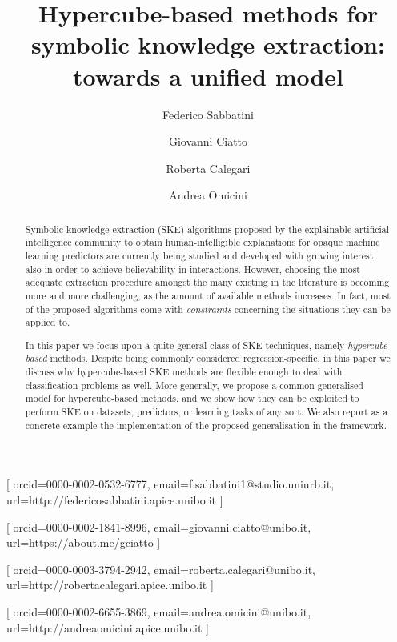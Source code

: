 \documentclass[
]{ceurart}
\begin{document}


\title{Hypercube-based methods for symbolic knowledge extraction: towards a unified model}

\author[1]{Federico Sabbatini}[%
orcid=0000-0002-0532-6777,
email=f.sabbatini1@studio.uniurb.it,
url=http://federicosabbatini.apice.unibo.it
]\cormark[1]
\address[1]{Dipartimento di Scienze Pure e Applicate (DiSPeA), Universit\`a di Urbino, Italy}

\author[2]{Giovanni Ciatto}[%
orcid=0000-0002-1841-8996,
email=giovanni.ciatto@unibo.it,
url=https://about.me/gciatto
]
\address[2]{Dipartimento di Informatica -- Scienza e Ingegneria (DISI), \textsc{Alma Mater Studiorum}---Universit\`a di Bologna, Italy}

\author[3]{Roberta Calegari}[%
orcid=0000-0003-3794-2942,
email=roberta.calegari@unibo.it,
url=http://robertacalegari.apice.unibo.it
]
\address[3]{Alma Mater Research Institute for Human-Centered Artificial Intelligence, \textsc{Alma Mater Studiorum}---Universit\`a di Bologna, Italy}

\author[2]{Andrea Omicini}[%
orcid=0000-0002-6655-3869,
email=andrea.omicini@unibo.it,
url=http://andreaomicini.apice.unibo.it
]


\begin{abstract}
Symbolic knowledge-extraction (SKE) algorithms proposed by the explainable artificial intelligence community to obtain human-intelligible explanations for opaque machine learning predictors are currently being studied and developed with growing interest also in order to achieve believability in interactions.
%
However, choosing the most adequate extraction procedure amongst the many existing in the literature is becoming more and more challenging, as the amount of available methods increases.
%
In fact, most of the proposed algorithms come with \emph{constraints} concerning the situations they can be applied to.

In this paper we focus upon a quite general class of SKE techniques, namely \emph{hypercube-based} methods.
%
Despite being commonly considered regression-specific, in this paper we discuss why hypercube-based SKE methods are flexible enough to deal with classification problems as well.
%
More generally, we propose a common generalised model for hypercube-based methods, and we show how they can be exploited to perform SKE on datasets, predictors, or learning tasks of any sort.
%
%
We also report as a concrete example the implementation of the proposed generalisation in the \psyke{} framework.
\end{abstract}
\end{document}
